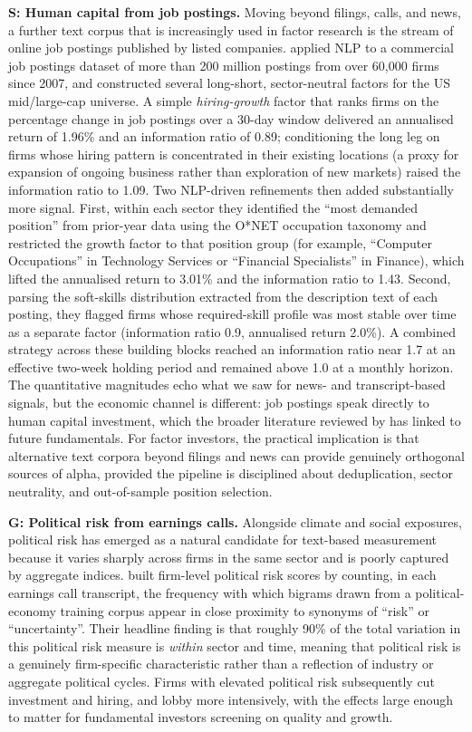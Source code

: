 \textbf{S: Human capital from job postings.} Moving beyond filings, calls, and news, a further text corpus that is increasingly used in factor research is the stream of online job postings published by listed companies. \cite{hafez2022jobs} applied NLP to a commercial job postings dataset of more than 200 million postings from over 60,000 firms since 2007, and constructed several long-short, sector-neutral factors for the US mid/large-cap universe. A simple \textit{hiring-growth} factor that ranks firms on the percentage change in job postings over a 30-day window delivered an annualised return of 1.96\% and an information ratio of 0.89; conditioning the long leg on firms whose hiring pattern is concentrated in their existing locations (a proxy for expansion of ongoing business rather than exploration of new markets) raised the information ratio to 1.09. Two NLP-driven refinements then added substantially more signal. First, within each sector they identified the ``most demanded position'' from prior-year data using the O*NET occupation taxonomy and restricted the growth factor to that position group (for example, ``Computer Occupations'' in Technology Services or ``Financial Specialists'' in Finance), which lifted the annualised return to 3.01\% and the information ratio to 1.43. Second, parsing the soft-skills distribution extracted from the description text of each posting, they flagged firms whose required-skill profile was most stable over time as a separate factor (information ratio 0.9, annualised return 2.0\%). A combined strategy across these building blocks reached an information ratio near 1.7 at an effective two-week holding period and remained above 1.0 at a monthly horizon. The quantitative magnitudes echo what we saw for news- and transcript-based signals, but the economic channel is different: job postings speak directly to human capital investment, which the broader literature reviewed by \cite{hafez2022jobs} has linked to future fundamentals. For factor investors, the practical implication is that alternative text corpora beyond filings and news can provide genuinely orthogonal sources of alpha, provided the pipeline is disciplined about deduplication, sector neutrality, and out-of-sample position selection.

\textbf{G: Political risk from earnings calls.} Alongside climate and social exposures, political risk has emerged as a natural candidate for text-based measurement because it varies sharply across firms in the same sector and is poorly captured by aggregate indices. \cite{hassan2019politicalrisk} built firm-level political risk scores by counting, in each earnings call transcript, the frequency with which bigrams drawn from a political-economy training corpus appear in close proximity to synonyms of ``risk'' or ``uncertainty''. Their headline finding is that roughly 90\% of the total variation in this political risk measure is \textit{within} sector and time, meaning that political risk is a genuinely firm-specific characteristic rather than a reflection of industry or aggregate political cycles. Firms with elevated political risk subsequently cut investment and hiring, and lobby more intensively, with the effects large enough to matter for fundamental investors screening on quality and growth.

